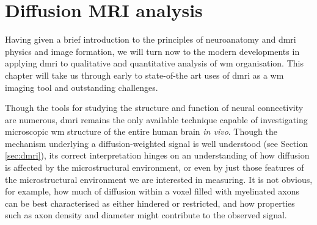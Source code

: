 \chapter{Diffusion MRI analysis}\label{chap:neuroimaging}

Having given a brief introduction to the principles of neuroanatomy and \gls{dmri} physics and image formation, we will turn now to the modern developments in applying \gls{dmri} to qualitative and quantitative analysis of \gls{wm} organisation.
This chapter will take us through early to state-of-the art uses of \gls{dmri} as a \gls{wm} imaging tool and outstanding challenges.

Though the tools for studying the structure and function of neural connectivity are numerous, \gls{dmri} remains the only available technique capable of investigating microscopic \gls{wm} structure of the entire human brain \textit{in vivo}.
Though the mechanism underlying a diffusion-weighted signal is well understood (see Section \ref{sec:dmri}), its correct interpretation hinges on an understanding of how diffusion is affected by the microstructural environment\autocite{LeBihan1995}, or even by just those features of the microstructural environment we are interested in measuring.
It is not obvious, for example, how much of diffusion within a voxel filled with myelinated axons can be best characterised as either hindered or restricted, and how properties such as axon density and diameter might contribute to the observed signal\autocite{Panagiotaki2012}.

